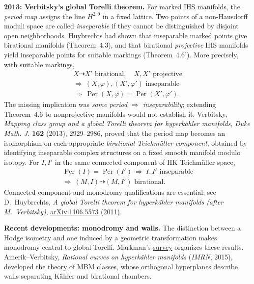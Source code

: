 \par\smallskip\noindent
\textbf{2013: Verbitsky's global Torelli theorem.}
For marked IHS manifolds, the \emph{period map}
assigns the line $H^{2,0}$ in a fixed
lattice. Two points of a non-Hausdorff
moduli space are called \emph{inseparable}
if they cannot be distinguished by disjoint
open neighborhoods. Huybrechts had shown
that inseparable marked points give
birational manifolds (Theorem~4.3), and
that birational \emph{projective} IHS
manifolds yield inseparable points for
suitable markings (Theorem~4.6').
More precisely, with suitable markings,
\[
\begin{gathered}
X\dashrightarrow X'\text{ birational},\quad X,X'\text{ projective}
\\[2pt]
\Longrightarrow\ (X,\varphi),(X',\varphi')\text{ inseparable}
\\[2pt]
\Longrightarrow\ \operatorname{Per}(X,\varphi)=\operatorname{Per}(X',\varphi').
\end{gathered}
\]
The missing implication was
\emph{same period $\Rightarrow$ inseparability};
extending Theorem~4.6 to nonprojective
manifolds would not establish it.
Verbitsky, \emph{Mapping class group and a global
Torelli theorem for hyperk\"ahler manifolds},
\emph{Duke Math. J.} \textbf{162} (2013),
2929--2986, proved that the period map
becomes an isomorphism on each appropriate
\emph{birational Teichm\"uller component},
obtained by identifying inseparable
complex structures on a fixed smooth
manifold modulo isotopy.
For $I,I'$ in the same connected component
of HK Teichm\"uller space,
\[
\begin{gathered}
\operatorname{Per}(I)=\operatorname{Per}(I')
\ \Longrightarrow\ I,I'\text{ inseparable}
\\[2pt]
\Longrightarrow\ (M,I)\dashrightarrow(M,I')\text{ birational}.
\end{gathered}
\]
Connected-component
and monodromy qualifications are essential;
see D.~Huybrechts,
\emph{A global Torelli theorem for hyperk\"ahler
manifolds (after M.~Verbitsky)},
\href{https://arxiv.org/abs/1106.5573}
{arXiv:1106.5573} (2011).

\par\smallskip\noindent
\textbf{Recent developments: monodromy and walls.}
The distinction between a Hodge isometry
and one induced by a geometric transformation
makes monodromy central to global Torelli.
Markman's
\href{https://arxiv.org/abs/1101.4606}
{survey} organizes these results.
Amerik--Verbitsky, \emph{Rational curves
on hyperk\"ahler manifolds} (\emph{IMRN},
2015), developed the theory of MBM
classes, whose orthogonal hyperplanes
describe walls separating K\"ahler
and birational chambers.

